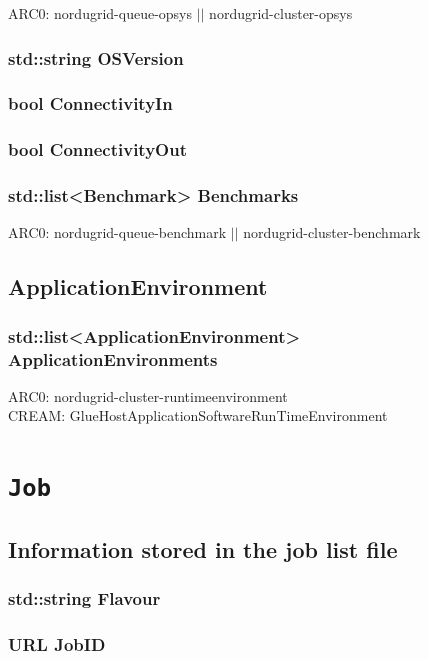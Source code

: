 \documentclass{book}
\newcommand{\Job}{\texttt{Job}}
\begin{document}
ARC0: nordugrid-queue-opsys $||$ nordugrid-cluster-opsys

\subsection*{std::string OSVersion}

\subsection*{bool ConnectivityIn}

\subsection*{bool ConnectivityOut}

\subsection*{std::list<Benchmark> Benchmarks}

ARC0: nordugrid-queue-benchmark $||$ nordugrid-cluster-benchmark

\section{ApplicationEnvironment}

\subsection*{std::list<ApplicationEnvironment> ApplicationEnvironments}

ARC0: nordugrid-cluster-runtimeenvironment \\
CREAM: GlueHostApplicationSoftwareRunTimeEnvironment

\chapter{{\Job}}
\label{app:job}

\section{Information stored in the job list file}

\subsection*{std::string Flavour}

\subsection*{URL JobID}
\end{document}
